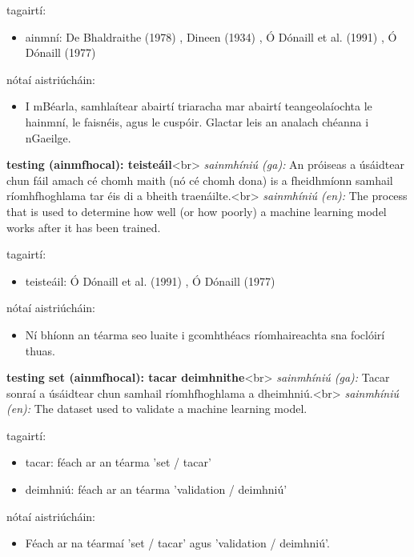 \documentclass{article}
\begin{document}
tagairtí:
\begin{itemize}
	\item ainmní: De Bhaldraithe (1978) \cite{de-bhaldraithe}, Dineen (1934) \cite{dineen}, Ó Dónaill et al. (1991) \cite{focloir-beag}, Ó Dónaill (1977) \cite{odonaill}
\end{itemize}

nótaí aistriúcháin:
\begin{itemize}
	\item I mBéarla, samhlaítear abairtí triaracha mar abairtí teangeolaíochta le hainmní, le faisnéis, agus le cuspóir. Glactar leis an analach chéanna i nGaeilge.
\end{itemize}


\textbf{testing (ainmfhocal): teisteáil}<br>
\textit{sainmhíniú (ga):} An próiseas a úsáidtear chun fáil amach cé chomh maith (nó cé chomh dona) is a fheidhmíonn samhail ríomhfhoghlama tar éis di a bheith traenáilte.<br>
\textit{sainmhíniú (en):} The process that is used to determine how well (or how poorly) a machine learning model works after it has been trained.

tagairtí:
\begin{itemize}
	\item teisteáil: Ó Dónaill et al. (1991) \cite{focloir-beag}, Ó Dónaill (1977) \cite{odonaill}
\end{itemize}

nótaí aistriúcháin:
\begin{itemize}
	\item Ní bhíonn an téarma seo luaite i gcomhthéacs ríomhaireachta sna foclóirí thuas.
\end{itemize}


\textbf{testing set (ainmfhocal): tacar deimhnithe}<br>
\textit{sainmhíniú (ga):} Tacar sonraí a úsáidtear chun samhail ríomhfhoghlama a dheimhniú.<br>
\textit{sainmhíniú (en):} The dataset used to validate a machine learning model.

tagairtí:
\begin{itemize}
	\item tacar: féach ar an téarma 'set / tacar'
	\item deimhniú: féach ar an téarma 'validation / deimhniú'
\end{itemize}

nótaí aistriúcháin:
\begin{itemize}
	\item Féach ar na téarmaí 'set / tacar' agus 'validation / deimhniú'.
\end{itemize}
\end{document}

